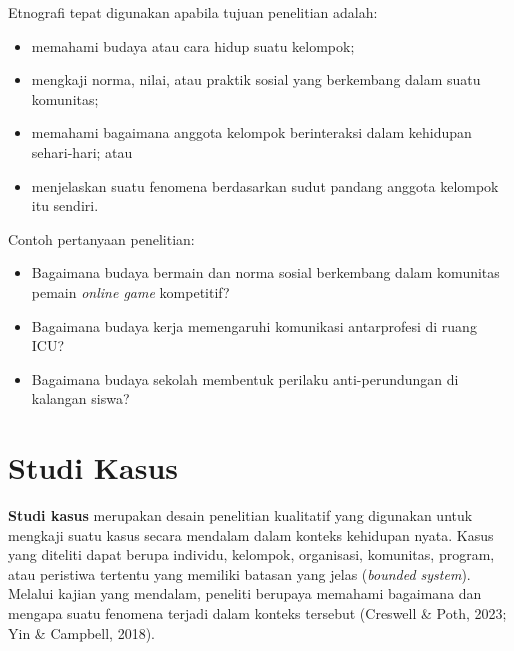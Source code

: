 \documentclass[
  indonesian,
  letterpaper,
  DIV=11,
  numbers=noendperiod]{scrreprt}
\providecommand{\tightlist}{%
  \setlength{\itemsep}{0pt}\setlength{\parskip}{0pt}}
\begin{document}
\begin{tcolorbox}[enhanced jigsaw, colframe=quarto-callout-tip-color-frame, toptitle=1mm, breakable, leftrule=.75mm, arc=.35mm, toprule=.15mm, colback=white, colbacktitle=quarto-callout-tip-color!10!white, bottomtitle=1mm, bottomrule=.15mm, titlerule=0mm, title={Kapan menggunakan etnografi?}, coltitle=black, left=2mm, opacitybacktitle=0.6, opacityback=0, rightrule=.15mm]

Etnografi tepat digunakan apabila tujuan penelitian adalah:

\begin{itemize}
\tightlist
\item
  memahami budaya atau cara hidup suatu kelompok;
\item
  mengkaji norma, nilai, atau praktik sosial yang berkembang dalam suatu
  komunitas;
\item
  memahami bagaimana anggota kelompok berinteraksi dalam kehidupan
  sehari-hari; atau
\item
  menjelaskan suatu fenomena berdasarkan sudut pandang anggota kelompok
  itu sendiri.
\end{itemize}

Contoh pertanyaan penelitian:

\begin{itemize}
\tightlist
\item
  Bagaimana budaya bermain dan norma sosial berkembang dalam komunitas
  pemain \emph{online game} kompetitif?
\item
  Bagaimana budaya kerja memengaruhi komunikasi antarprofesi di ruang
  ICU?
\item
  Bagaimana budaya sekolah membentuk perilaku anti-perundungan di
  kalangan siswa?
\end{itemize}

\end{tcolorbox}

\section{Studi Kasus}\label{studi-kasus}

\textbf{Studi kasus} merupakan desain penelitian kualitatif yang
digunakan untuk mengkaji suatu kasus secara mendalam dalam konteks
kehidupan nyata. Kasus yang diteliti dapat berupa individu, kelompok,
organisasi, komunitas, program, atau peristiwa tertentu yang memiliki
batasan yang jelas (\emph{bounded system}). Melalui kajian yang
mendalam, peneliti berupaya memahami bagaimana dan mengapa suatu
fenomena terjadi dalam konteks tersebut (Creswell \& Poth, 2023; Yin \&
Campbell, 2018).
\end{document}
